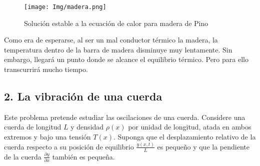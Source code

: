 \documentclass[11pt]{article}
\begin{document}
	\begin{figure}[h]
		\centering
		\texttt{[image: Img/madera.png]}
		\caption{Solución estable a la ecuación de calor para madera de Pino}
		\label{}
	\end{figure}
	
	Como era de esperarse, al ser un mal conductor térmico la madera, la temperatura dentro de la barra de madera disminuye muy lentamente. Sin embargo, llegará un punto donde se alcance el equilibrio térmico. Pero para ello transcurrirá mucho tiempo.



\subsection*{\textbf{2. La vibración de una cuerda}}
	Este problema pretende estudiar las oscilaciones de una cuerda. Considere una cuerda de longitud $L$ y densidad $\rho(x)$ por unidad de longitud, atada en ambos extremos y 
	bajo una tensión $T(x)$. Suponga que el desplazamiento relativo de la cuerda respecto a su posición de equilibrio $\frac{y(x,t)}{L}$ es pequeño y que la pendiente de la cuerda $\frac{\partial y}{\partial x}$ también es pequeña.
	
\end{document}
